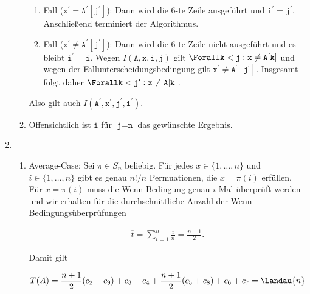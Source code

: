 \begin{solution}
\begin{enumerate}[label = (\alph*)]
\begin{enumerate}[label = \arabic*.]
    \begin{enumerate}[label = \Roman*.]
      
      \item Fall ($\texttt{x}^\prime = \texttt{A}^\prime[\texttt{j}^\prime]$):
      Dann wird die $6$-te Zeile ausgeführt und $\texttt{i}^\prime = \texttt{j}^\prime$.
      Anschließend terminiert der Algorithmus.

      \item Fall ($\texttt{x}^\prime \neq \texttt{A}^\prime[\texttt{j}^\prime]$):
      Dann wird die $6$-te Zeile nicht ausgeführt und es bleibt $\texttt{i}^\prime = \texttt{i}$.
      Wegen $I(\texttt{A}, \texttt{x}, \texttt{i}, \texttt{j})$ gilt $\Forall \texttt{k} < \texttt{j}: \texttt{x} \neq \texttt{A}[\texttt{k}]$ und wegen der Fallunterscheidungsbedingung gilt $\texttt{x}^\prime \neq \texttt{A}^\prime[\texttt{j}^\prime]$.
      Insgesamt folgt daher $\Forall \texttt{k} < \texttt{j}^\prime: \texttt{x} \neq \texttt{A}[\texttt{k}]$.
    \end{enumerate}

    Also gilt auch $I(\texttt{A}^\prime, \texttt{x}^\prime, \texttt{j}^\prime, \texttt{i}^\prime)$.

    \item Offensichtlich ist $\texttt{i}$ für $\texttt{j} = \texttt{n}$ das gewünschte Ergebnis.

  \end{enumerate}

  \item
  
  \begin{enumerate}[label = \arabic*.]

    \item Average-Case:
    Sei $\pi \in S_n$ beliebig. Für jedes $x \in \{1,\dots,n\}$
    und $i \in \{1,\dots,n\}$
    gibt es genau $n!/n$ Permuationen, die $x = \pi(i)$ erfüllen.
    Für $x = \pi(i)$ muss die Wenn-Bedingung genau $i$-Mal überprüft werden und wir erhalten
    für die durchschnittliche Anzahl der Wenn-Bedingungsüberprüfungen
    
    \begin{align*}
      \overline{t} = \sum_{i=1}^n \frac{i}{n} = \frac{n+1}{2}.
    \end{align*}
    
    Damit gilt
    
    \begin{align*}
      T(A) = \frac{n+1}{2}(c_2 + c_9) + c_3 + c_4 + \frac{n+1}{2}(c_5 + c_8) + c_6 + c_7 = \Landau{n}
    \end{align*}  


\end{enumerate}
\end{enumerate}
\end{solution}
